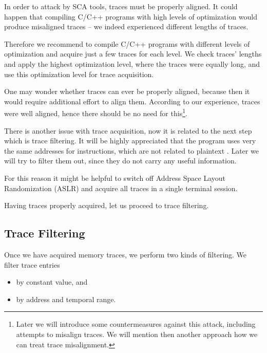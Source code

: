 \begin{note}
\label{note:optim}
	In order to attack by SCA tools, traces must be properly aligned. It could happen that compiling C/C++ programs with high levels of optimization would produce misaligned traces -- we indeed experienced different lengths of traces.
	
	Therefore we recommend to compile C/C++ programs with different levels of optimization and acquire just a few traces for each level. We check traces' lengths and apply the highest optimization level, where the traces were equally long, and use this optimization level for trace acquisition.
\end{note}

One may wonder whether traces can ever be properly aligned, because then it would require additional effort to align them. According to our experience, traces were well aligned, hence there should be no need for this\footnote{Later we will introduce some countermeasures against this attack, including attempts to misalign traces. We will mention then another approach how we can treat trace misalignment.}.

\begin{note}
\label{note:aslr}
	There is another issue with trace acquisition, now it is related to the next step which is trace filtering. It will be highly appreciated that the program uses very the same addresses for instructions, which are not related to plaintext . Later we will try to filter them out, since they do not carry any useful information.
	
	For this reason it might be helpful to switch off Address Space Layout Randomization (ASLR) and acquire all traces in a single terminal session.
\end{note}

Having traces properly acquired, let us proceed to trace filtering.



\subsection{Trace Filtering}
\label{sec:filter}

Once we have acquired memory traces, we perform two kinds of filtering. We filter trace entries
\begin{itemize}
	\item by constant value, and
	\item by address and temporal range.
\end{itemize}

